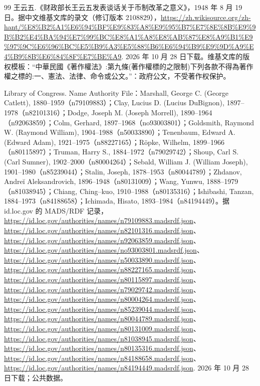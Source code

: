 \begin{thebibliography}{99}
 王云五.《财政部长王云五发表谈话关于币制改革之意义》，1948 年 8 月 19 日。据中文维基文库的录文（修订版本 2108829），\url{https://zh.wikisource.org/zh-hant/\%E8\%B2\%A1\%E6\%94\%BF\%E9\%83\%A8\%E9\%95\%B7\%E7\%8E\%8B\%E9\%9B\%B2\%E4\%BA\%94\%E7\%99\%BC\%E8\%A1\%A8\%E8\%AB\%87\%E8\%A9\%B1\%E9\%97\%9C\%E6\%96\%BC\%E5\%B9\%A3\%E5\%88\%B6\%E6\%94\%B9\%E9\%9D\%A9\%E4\%B9\%8B\%E6\%84\%8F\%E7\%BE\%A9}. 2026 年 10 月 28 日下载。维基文库的版权模板：“中華民國《著作權法》:第九條(著作權標的之限制)下列各款不得為著作權之標的:一、憲法、法律、命令或公文。”：政府公文，不受著作权保护。

 Library of Congress. Name Authority File：Marshall, George C. (George Catlett), 1880--1959（n79109883）；Clay, Lucius D. (Lucius DuBignon), 1897--1978（n82101316）；Dodge, Joseph M. (Joseph Morrell), 1890--1964（n92063859）；Colm, Gerhard, 1897--1968（no93003801）；Goldsmith, Raymond W. (Raymond William), 1904--1988（n50033890）；Tenenbaum, Edward A. (Edward Adam), 1921--1975（n88227165）；Röpke, Wilhelm, 1899--1966（n80115897）；Truman, Harry S., 1884--1972（n79029742）；Shoup, Carl S. (Carl Sumner), 1902--2000（n80004264）；Sebald, William J. (William Joseph), 1901--1980（n85239044）；Stalin, Joseph, 1878--1953（n80044789）；Zhdanov, Andreĭ Aleksandrovich, 1896--1948（n80131009）；Wang, Yunwu, 1888--1979（n81038945）；Chiang, Ching--kuo, 1910--1988（n80135316）；Ishibashi, Tanzan, 1884--1973（n84188658）；Ichimada, Hisato, 1893--1984（n84194449）。据 id.loc.gov 的 MADS/RDF 记录，\url{https://id.loc.gov/authorities/names/n79109883.madsrdf.json}、\url{https://id.loc.gov/authorities/names/n82101316.madsrdf.json}、\url{https://id.loc.gov/authorities/names/n92063859.madsrdf.json}、\url{https://id.loc.gov/authorities/names/no93003801.madsrdf.json}、\url{https://id.loc.gov/authorities/names/n50033890.madsrdf.json}、\url{https://id.loc.gov/authorities/names/n88227165.madsrdf.json}、\url{https://id.loc.gov/authorities/names/n80115897.madsrdf.json}、\url{https://id.loc.gov/authorities/names/n79029742.madsrdf.json}、\url{https://id.loc.gov/authorities/names/n80004264.madsrdf.json}、\url{https://id.loc.gov/authorities/names/n85239044.madsrdf.json}、\url{https://id.loc.gov/authorities/names/n80044789.madsrdf.json}、\url{https://id.loc.gov/authorities/names/n80131009.madsrdf.json}、\url{https://id.loc.gov/authorities/names/n81038945.madsrdf.json}、\url{https://id.loc.gov/authorities/names/n80135316.madsrdf.json}、\url{https://id.loc.gov/authorities/names/n84188658.madsrdf.json}、\url{https://id.loc.gov/authorities/names/n84194449.madsrdf.json}. 2026 年 10 月 28 日下载；公共数据。


\end{thebibliography}
